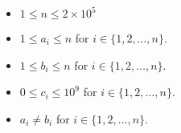 \begin{itemize}
\tightlist
\item $1 \le n \le 2\times 10^5$
\item $1\le a_i\le n$ for $i\in \{1,2,\dots,n\}$.
\item $1\le b_i\le n$ for $i\in \{1,2,\dots,n\}$.
\item $0\le c_i\le 10^9$ for $i\in \{1,2,\dots,n\}$.
\item $a_i\neq b_i$ for $i\in \{1,2,\dots,n\}$.
\end{itemize}
\newpage

